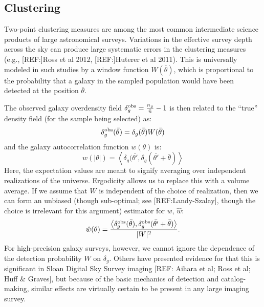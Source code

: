 \documentclass[11pt]{book}
\begin{document}
\subsection{Clustering}
Two-point clustering measures are among the most common intermediate
science products of large astronomical surveys. Variations in the
effective survey depth across the sky can produce large systematic
errors in the clustering measures (e.g., [REF:]Ross et al 2012, [REF:]Huterer et
al 2011). This is universally modeled in such studies  by a window
function $W(\bar{\theta})$, which is proportional to the probability
that a galaxy in the sampled population would have been detected at
the position $\bar{\theta}$.

The observed galaxy overdensity field $\delta_g^{\rm obs} =
\frac{n_g}{\bar{n}}-1$ is then related to the ``true'' density field
(for the sample being selected) as:
\begin{equation}
\delta_g^{\rm obs}(\bar{\theta}) = \delta_g(\bar{\theta}) W(\bar{\theta})
\end{equation}
and the galaxy autocorrelation function $w(\theta)$ is:
\begin{equation}
w(|\theta|) = \left<\delta_g (\bar{\theta'}, \delta_g (\bar{\theta'}+\bar{\theta})\right>
\end{equation}
Here, the expectation values are meant to signify averaging over
independent realizations of the universe. Ergodicity allows us to
replace this with a volume average. If we assume that $W$ is
independent of the choice of realization, then we can form an unbiased
(though sub-optimal; see [REF:Landy-Szalay], though the choice is
irrelevant for this argument) estimator for $w$, $\hat{w}$:
\begin{equation}
\hat{w}(\theta) = \frac{\left<\delta_g^{\rm obs}(\bar{\theta}),
    \delta_g^{\rm obs}(\bar{\theta'}+\bar{\theta})\right>}{|W|^2}.
\end{equation}
For high-precision galaxy surveys, however, we cannot ignore the
dependence of the detection probability $W$ on $\delta_g$. Others have
presented evidence for that this is significant in Sloan Digital Sky
Survey imaging [REF: Aihara et al; Ross et al; Huff \& Graves], but
because of the basic mechanics of detection and catalog-making,
similar effects are virtually certain to be present in any large
imaging survey.
\end{document}
